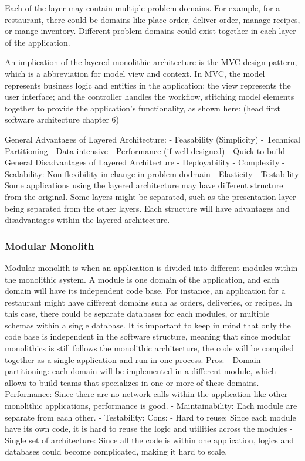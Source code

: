 Each of the layer may contain multiple problem domains. For example, for a restaurant, there could be domains like place order, 
deliver order, manage recipes, or mange inventory. Different problem domains could exist together in each layer of  the application. 

An implication of the layered monolithic architecture is the MVC design pattern, which is a abbreviation for model view and context.
In MVC, the model represents business logic and entities in the application; the view represents the user interface; 
and the controller handles the workflow, stitching model elements together to provide the application’s functionality, as shown here: (head first software architecture chapter 6)

General Advantages of Layered Architecture:
-	Feasability (Simplicity)
-	Technical Partitioning
-	Data-intensive
-	Performance (if well designed)
-	Quick to build
-	
General Disadvantages of Layered Architecture
-	Deployability
-	Complexity
-	Scalability: Non flexibility in change in problem dodmain
-	Elasticity
-	Testability
Some applications using the layered architecture may have different structure from the original. Some layers might be separated, 
such as the presentation layer being separated from the other layers. Each structure will have advantages and disadvantages within the layered architecture.

\subsubsection[Modular Monolith]{Modular Monolith}
Modular monolith is when an application is divided into different modules within the monolithic system. A module is one domain of the application,
and each domain will have its independent code base. For instance, an application for a restaurant might have different domains such as orders, deliveries, or recipes.
In this case, there could be separate databases for each modules, or multiple schemas within a single database.
It is important to keep in mind that only the code base is independent in the software structure, meaning that since modular monolithics
is still follows the monolithic architecture, the code will be compiled together as a single application and run in one process.
Pros: 
-	Domain partitioning: each domain will be implemented in a different module, which allows to build teams that specializes in one or more of these domains.
-	Performance: Since there are no network calls within the application like other monolithic applications, performance is good.
-	Maintainability: Each module are separate from each other.
-	Testability:
Cons:
-	Hard to reuse: Since each module have its own code, it is hard to reuse the logic and utilities across the modules
-	Single set of architecture: Since all the code is within one application, logics and databases could become complicated, making it hard to scale.

